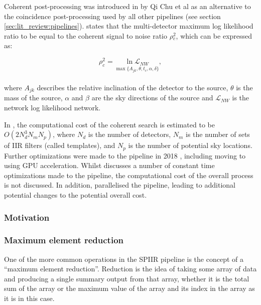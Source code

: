 \documentclass{article}
\begin{document}
Coherent post-processing was introduced in \cite{ChuThesis} by Qi Chu et al as an alternative to the coincidence post-processing used by all other pipelines (see section \ref{sec:lit_review:pipelines}).
\cite{ChuThesis} states that the multi-detector maximum log likelihood ratio to be equal to the coherent signal to noise ratio \(\rho{}^2_c\), which can be expressed as:

\begin{equation} \label{eq:coh_snr}
    \rho^2_c = \underset{\max\{A_{jk},\theta,t_{c},\alpha,\delta\}}{\ln \mathcal{L}_{NW}},
\end{equation}
\\
where \(A_{jk}\) describes the relative inclination of the detector to the source, \(\theta\) is the mass of the source, \(\alpha\) and \(\beta\) are the sky directions of the source and \(\mathcal{L}_{NW}\) is the network log likelihood network.

In \cite{ChuThesis}, the computational cost of the coherent search is estimated to be \(O(2N^3_dN_mN_p)\), where \(N_d\) is the number of detectors, \(N_m\) is the number of sets of IIR filters (called templates), and \(N_p\) is the number of potential sky locations.
Further optimizations were made to the pipeline in 2018 \cite{SPIIRGPU2018}, including moving to using GPU acceleration.
Whilst \cite{SPIIRGPU2018} discusses a number of constant time optimizations made to the pipeline, the computational cost of the overall process is not discussed.
In addition, \cite{SPIIRGPU2018} parallelised the pipeline, leading to additional potential changes to the potential overall cost.

\subsubsection{Motivation} \label{sec:discuss:analysis:motivation}


\subsubsection{Maximum element reduction} \label{sec:discuss:analysis:reduce}

One of the more common operations in the SPIIR pipeline is the concept of a ``maximum element reduction''.
Reduction is the idea of taking some array of data and producing a single summary output from that array, whether it is the total sum of the array or the maximum value of the array and its index in the array as it is in this case.
\end{document}
